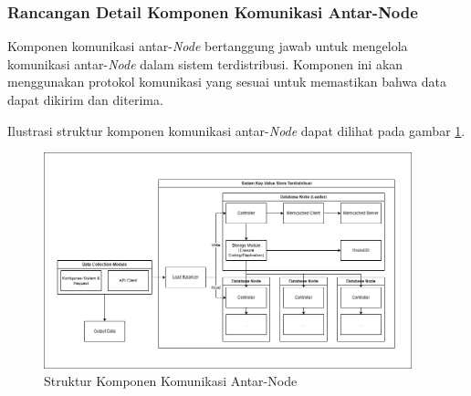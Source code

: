\subsubsection{Rancangan Detail Komponen Komunikasi Antar-Node}
\label{subsubsection:detail-subsistem-komunikasi-antar-node}

Komponen komunikasi antar-\textit{Node} bertanggung jawab untuk mengelola komunikasi antar-\textit{Node} dalam sistem terdistribusi. Komponen ini akan menggunakan protokol komunikasi yang sesuai untuk memastikan bahwa data dapat dikirim dan diterima.

Ilustrasi struktur komponen komunikasi antar-\textit{Node} dapat dilihat pada gambar \ref{fig:node-communication-structure}.

\begin{figure}[ht]
    \centering
    \includegraphics[width=0.95\textwidth]{resources/chapter-3/general-architecture.png}
    \caption{Struktur Komponen Komunikasi Antar-Node}
    \label{fig:node-communication-structure}
\end{figure}